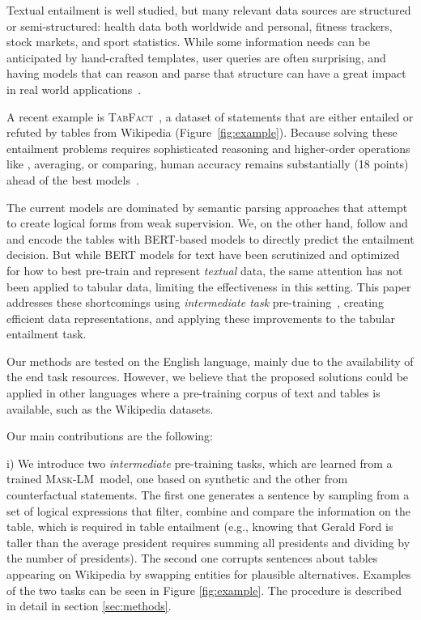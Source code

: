 \documentclass[11pt,a4paper]{article}
\newcommand{\tabfact}{\textsc{TabFact}\xspace}
\newcommand{\bert}{\textsc{BERT}\xspace}
\newcommand{\masklm}{\textsc{Mask-LM}\xspace}
\theoremstyle{definition}
\begin{document}
Textual entailment is well studied, but many relevant data sources are structured or semi-structured: 
health data both worldwide and personal, fitness trackers, stock markets, and sport statistics.
While some information needs can be anticipated by hand-crafted templates, user queries are often surprising, and having models that can reason and parse that structure can have a great impact in real world applications~\cite{Khashabi19, aristo}.

A recent example is \tabfact~\cite{2019TabFactA}, a dataset of statements that are either entailed or refuted by tables from Wikipedia (Figure~\ref{fig:example}).
Because solving these entailment problems requires sophisticated reasoning and higher-order operations like , averaging, or comparing, human accuracy remains substantially (18 points) ahead of the best models~\cite{zhong2020logicalfactchecker}.

The current models are dominated by semantic parsing approaches that attempt to create logical forms from weak supervision.
We, on the other hand, follow \citet{herzig-2020} and \citet{2019TabFactA} and encode the tables with \bert{}-based models to directly predict the entailment decision.
But while \bert{} models for text have been scrutinized and optimized for how to best pre-train and represent \emph{textual} data, the same attention has not been applied to tabular data, limiting the effectiveness in this setting.
This paper addresses these shortcomings using \emph{intermediate task} pre-training~\cite{pruksachatkun-2020-intermediate-task}, creating efficient data representations, and applying these improvements to the tabular entailment task. 

Our methods are tested on the English language, mainly due to the availability of the end task resources. However, we believe that the proposed solutions could be applied in other languages where a pre-training corpus of text and tables is available, such as the Wikipedia datasets.







Our main contributions are the following: 

i) We introduce two \emph{intermediate} pre-training tasks, which are learned from a trained \masklm{}~model, one based on synthetic and the other from counterfactual statements.
The first one generates a sentence by sampling from a set of logical expressions that filter, combine and compare the information on the table, which is required in table entailment (e.g., knowing that Gerald Ford is taller than the average president requires summing all presidents and dividing by the number of presidents).
The second one corrupts sentences about tables appearing on Wikipedia by swapping entities for plausible alternatives.
Examples of the two tasks can be seen in Figure \ref{fig:example}. 
The procedure is described in detail in section \ref{sec:methods}.
\end{document}
